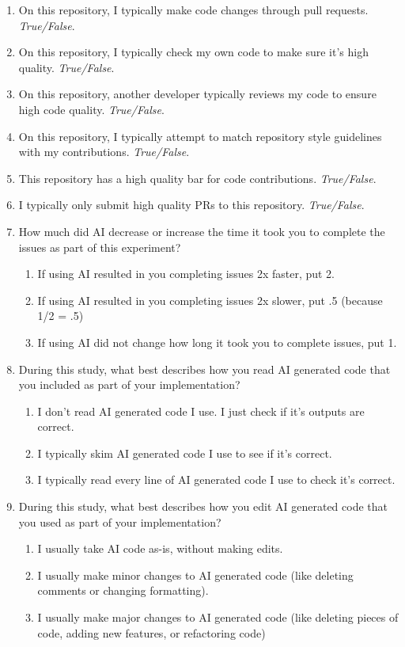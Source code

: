 \documentclass{article}
\begin{document}
\begin{instructionbox}
\begin{enumerate}
    \item On this repository, I typically make code changes through pull requests. \textit{True/False}.
    \item On this repository, I typically check my own code to make sure it's high quality. \textit{True/False}.
    \item On this repository, another developer typically reviews my code to ensure high code quality. \textit{True/False}.
    \item On this repository, I typically attempt to match repository style guidelines with my contributions. \textit{True/False}.
    \item This repository has a high quality bar for code contributions. \textit{True/False}.
    \item I typically only submit high quality PRs to this repository. \textit{True/False}.
    \item How much did AI decrease or increase the time it took you to complete the issues as part of this experiment?
    \begin{enumerate}
        \item If using AI resulted in you completing issues 2x faster, put 2.
        \item If using AI resulted in you completing issues 2x slower, put .5 (because 1/2 = .5) 
        \item If using AI did not change how long it took you to complete issues, put 1.
    \end{enumerate}
    \item During this study, what best describes how you read AI generated code that you included as part of your implementation?
    \begin{enumerate}
        \item I don't read AI generated code I use. I just check if it's outputs are correct.
        \item I typically skim AI generated code I use to see if it's correct.
        \item I typically read every line of AI generated code I use to check it's correct.
    \end{enumerate}
    \item During this study, what best describes how you edit AI generated code that you used as part of your implementation?
    \begin{enumerate}
        \item I usually take AI code as-is, without making edits.
        \item I usually make minor changes to AI generated code (like deleting comments or changing formatting).
        \item I usually make major changes to AI generated code (like deleting pieces of code, adding new features, or refactoring code)
    \end{enumerate}
\end{enumerate}
    
\end{instructionbox}
\end{document}
